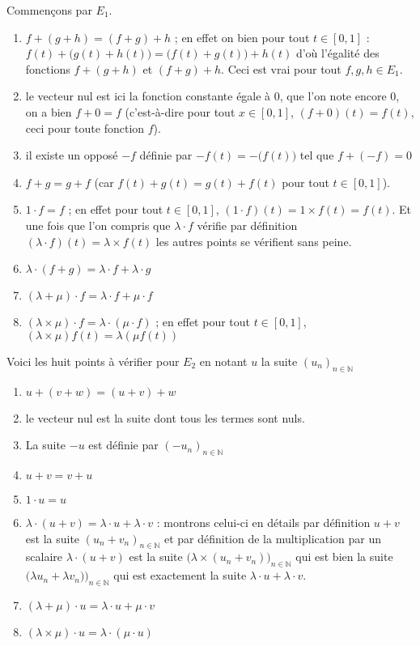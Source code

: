 \documentclass[11pt,a4paper]{article}
\newcommand{\Nn}{\mathbb{N}} \newcommand{\N}{\mathbb{N}}
\begin{document}
Commençons par $E_1$.
\begin{enumerate}
  \item $f+(g+h)=(f+g)+h$ ; en effet on bien pour tout $t\in[0,1]$ : $f(t)+\big(g(t)+h(t)\big)=\big(f(t)+g(t)\big)+h(t)$
d'où l'égalité des fonctions $f+(g+h)$ et $(f+g)+h$. Ceci est vrai pour tout $f,g,h \in E_1$.
  \item le vecteur nul est ici la fonction constante égale à $0$, que l'on note encore $0$, on a bien $f+0=f$ 
(c'est-à-dire pour tout $x\in[0,1]$, $(f+0)(t)=f(t)$, ceci pour toute fonction $f$).
  \item il existe un opposé $-f$ définie par $-f(t) = - \big(f(t)\big)$ tel que $f+(-f)=0$ 
  \item $f+g=g+f$ (car $f(t)+g(t)=g(t)+f(t)$ pour tout $t\in[0,1]$).
  \item $1\cdot f = f$ ; en effet pour tout $t\in[0,1]$, $(1\cdot f)(t) = 1\times f(t) = f(t)$.
Et une fois que l'on compris que $\lambda\cdot f$ vérifie par définition 
$(\lambda\cdot f)(t) = \lambda\times f(t)$ les autres points se vérifient sans peine.
  \item $\lambda \cdot (f+g) = \lambda\cdot f + \lambda \cdot g$
  \item $(\lambda+\mu) \cdot f = \lambda\cdot f+ \mu \cdot f$
  \item $(\lambda\times\mu) \cdot f = \lambda\cdot (\mu\cdot f)$ ; en effet pour tout $t\in [0,1]$,
 $(\lambda\times\mu)  f (t) = \lambda (\mu f(t))$
\end{enumerate}

\bigskip

Voici les huit points à vérifier pour $E_2$ en notant $u$ la suite $(u_n)_{n\in\Nn}$

\begin{enumerate}
  \item $u+(v+w)=(u+v)+w$ 
  \item le vecteur nul est la suite dont tous les termes sont nuls.
  \item La suite $-u$ est définie par $(-u_n)_{n\in\Nn}$
  \item $u+v=v+u$

  \item $1\cdot u = u$
  \item $\lambda \cdot (u+v) = \lambda\cdot u + \lambda \cdot v$ : montrons celui-ci en détails
par définition $u+v$ est la suite $(u_n+v_n)_{n\in\Nn}$ et par définition de la multiplication par un scalaire
$\lambda \cdot (u+v)$ est la suite $\big(\lambda\times (u_n+v_n)\big)_{n\in\Nn}$ qui est bien la suite
$\big(\lambda u_n+ \lambda v_n)\big)_{n\in\Nn}$ qui est exactement la suite $\lambda\cdot u + \lambda\cdot v$.
  \item $(\lambda+\mu) \cdot u = \lambda\cdot u+ \mu \cdot v$ 
  \item $(\lambda\times\mu) \cdot u = \lambda\cdot (\mu\cdot u)$ 
\end{enumerate}
\end{document}

